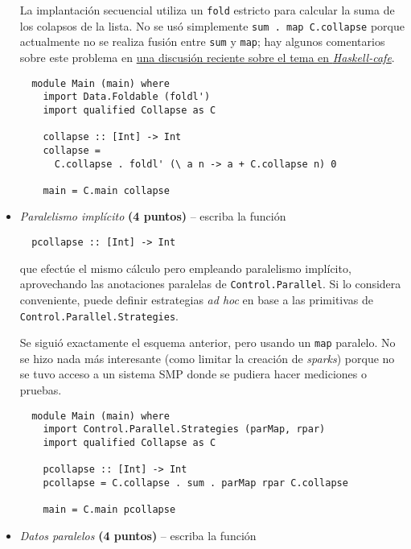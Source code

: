 \documentclass[11pt,fleqn]{article}
\newenvironment{answer}{%
  \def\FrameCommand{\fboxsep=\FrameSep \fcolorbox{black}{midgrey}}%
  \color{black}\MakeFramed {\FrameRestore}}%
 {\endMakeFramed}
\begin{document}
\begin{itemize}
\begin{answer}
  La implantación secuencial utiliza un \texttt{fold} estricto para
  calcular la suma de los colapsos de la lista.  No se usó simplemente
  \texttt{sum . map C.collapse} porque actualmente no se realiza fusión
  entre \texttt{sum} y \texttt{map}; hay algunos comentarios sobre este
  problema en \href{
    http://www.haskell.org/pipermail/haskell-cafe/2012-June/101971.html
  }{una discusión reciente sobre el tema en \textit{Haskell-cafe}}.

\begin{lstlisting}
  module Main (main) where
    import Data.Foldable (foldl')
    import qualified Collapse as C

    collapse :: [Int] -> Int
    collapse =
      C.collapse . foldl' (\ a n -> a + C.collapse n) 0

    main = C.main collapse
\end{lstlisting}
\end{answer}

\item
  \emph{Paralelismo implícito} \textbf{(4 puntos)} -- escriba la función

\begin{lstlisting}
  pcollapse :: [Int] -> Int
\end{lstlisting}

  que efectúe el mismo cálculo pero empleando paralelismo implícito,
  aprovechando las anotaciones paralelas de \texttt{Control.Parallel}.
  Si lo considera conveniente, puede definir estrategias \emph{ad hoc}
  en base a las primitivas de \texttt{Control.Parallel.Strategies}.

\begin{answer}
  Se siguió exactamente el esquema anterior, pero usando un \texttt{map}
  paralelo.  No se hizo nada más interesante (como limitar la creación
  de \textit{sparks}) porque no se tuvo acceso a un sistema SMP donde se
  pudiera hacer mediciones o pruebas.

\begin{lstlisting}
  module Main (main) where
    import Control.Parallel.Strategies (parMap, rpar)
    import qualified Collapse as C

    pcollapse :: [Int] -> Int
    pcollapse = C.collapse . sum . parMap rpar C.collapse

    main = C.main pcollapse
\end{lstlisting}
\end{answer}

\item
  \emph{Datos paralelos} \textbf{(4 puntos)} -- escriba la función


\end{itemize}
\end{document}
